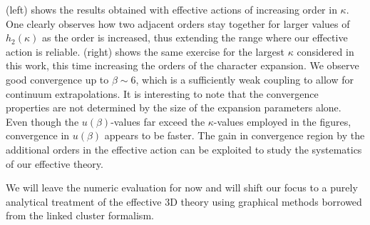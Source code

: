  (left) shows the results obtained with
effective actions of increasing order in $\kappa$. One clearly observes how two
adjacent orders stay together for larger values of $h_2(\kappa)$ as the order is
increased, thus extending the range where our effective action is reliable.
 (right) shows the same exercise for the
largest $\kappa$ considered in this work, this time increasing the orders of the
character expansion. We observe good convergence up to $\beta\sim 6$, which is a
sufficiently weak coupling to allow for continuum extrapolations. It is
interesting to note that the convergence properties are not determined by the
size of the expansion parameters alone.  Even though the $u(\beta)$-values far
exceed the $\kappa$-values employed in the figures, convergence in $u(\beta)$
appears to be faster.  The gain in convergence region by the additional orders
in the effective action can be exploited to study the systematics of our
effective theory.
%

We will leave the numeric evaluation for now and will shift our focus to a
purely analytical treatment of the effective 3D theory using graphical methods
borrowed from the linked cluster formalism.
